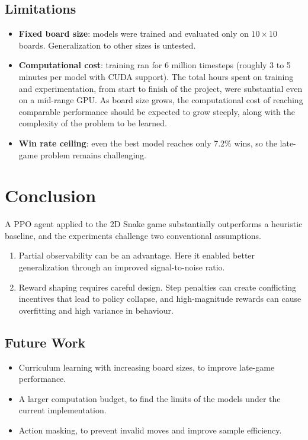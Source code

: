 \documentclass[10pt, conference, letterpaper]{IEEEtran}
\begin{document}
\subsection{Limitations}

\begin{itemize}
  \item \textbf{Fixed board size}: models were trained and evaluated only on $10 \times 10$ boards. Generalization to other sizes is untested.
  \item \textbf{Computational cost}: training ran for 6 million timesteps (roughly 3 to 5 minutes per model with CUDA support). The total hours spent on training and experimentation, from start to finish of the project, were substantial even on a mid-range GPU. As board size grows, the computational cost of reaching comparable performance should be expected to grow steeply, along with the complexity of the problem to be learned.
  \item \textbf{Win rate ceiling}: even the best model reaches only 7.2\% wins, so the late-game problem remains challenging.
\end{itemize}

\section{Conclusion}

A PPO agent applied to the 2D Snake game substantially outperforms a heuristic baseline, and the experiments challenge two conventional assumptions.

\begin{enumerate}
  \item Partial observability can be an advantage. Here it enabled better generalization through an improved signal-to-noise ratio.
  \item Reward shaping requires careful design. Step penalties can create conflicting incentives that lead to policy collapse, and high-magnitude rewards can cause overfitting and high variance in behaviour.
\end{enumerate}

\subsection{Future Work}

\begin{itemize}
  \item Curriculum learning with increasing board sizes, to improve late-game performance.
  \item A larger computation budget, to find the limits of the models under the current implementation.
  \item Action masking, to prevent invalid moves and improve sample efficiency.
\end{itemize}



\end{document}
